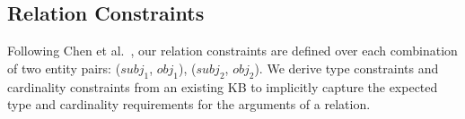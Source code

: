 \subsection{Relation Constraints}
\label{sec:constraints}



Following Chen et al.~, our relation constraints are defined over each combination of two entity pairs: ($subj_1$, $obj_1$), ($subj_2$, $obj_2$).
We derive type constraints and cardinality constraints from an existing KB to implicitly capture the expected type and cardinality requirements for the arguments of a relation. 
